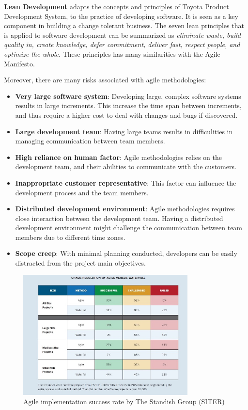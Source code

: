 \textbf{Lean Development} adapts the concepts and principles of Toyota Product Development System, to the practice of developing software\cite{Poppendieck:2007:LSD:1248821.1248986}. It is seen as a key component in building a change tolerant business\cite{cawley2010lean}. The seven lean principles that is applied to software development can be summarized as \textit{eliminate waste, build quality in, create knowledge, defer commitment, deliver fast, respect people, and optimize the whole}\cite{Pressman:2009:SEP:1593949,Poppendieck:2007:LSD:1248821.1248986}. These principles has many similarities with the Agile Manifesto.

Moreover, there are many risks associated with agile methodologies\cite{hijazi2012review}:
\begin{itemize}
	\item \textbf{Very large software system}: Developing large, complex software systems results in large increments. This increase the time span between increments, and thus require a higher cost to deal with changes and bugs if discovered.
	\item \textbf{Large development team}: Having large teams results in difficulities in managing communication between team members.
	\item \textbf{High reliance on human factor}: Agile methodologies relies on the development team, and their abilities to communicate with the customers.
	\item \textbf{Inappropriate customer representative}: This factor can influence the development process and the team members.
	\item \textbf{Distributed development environment}: Agile methodologies requires close interaction between the development team. Having a distributed development environment might challenge the communication between team members due to different time zones.
	\item \textbf{Scope creep}: With minimal planning conducted, developers can be easily distracted from the project main objectives.
\end{itemize}


\begin{figure}
	\centering
	\includegraphics[width=0.8\textwidth]{images/Agile-Waterfall-Success-Failure-Rates.jpg}
	\caption{Agile implementation success rate by The Standish Group (SITER)}
	\label{fig:agileWaterfallSuccessFailureRates}
\end{figure}


